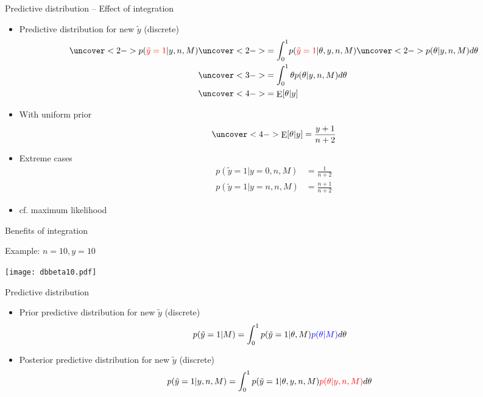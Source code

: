 \documentclass[english,t]{beamer}
\DeclareMathOperator{\E}{E}
\begin{document}
\begin{frame}{Predictive distribution -- Effect of integration}

  \begin{itemize}
  \item Predictive distribution for new $\tilde{y}$ (discrete)
    \begin{align*}
      \uncover<2->{p({\color{red}\tilde{y}=1}|y,n,M)} & \uncover<2->{= \int_0^1} p({\color{red}\tilde{y}=1}|\theta,y,n,M) \uncover<2->{p(\theta|y,n,M)d\theta}\\
                                                      &\uncover<3->{= \int_0^1 \theta p(\theta|y,n,M)d\theta}\\
                                                      &\uncover<4->{= \E[\theta|y]}
    \end{align*}
    \vskip -4mm
  \item<5-> With uniform prior
    \begin{align*}
      \uncover<4->{\E[\theta|y] = \frac{y+1}{n+2}}
    \end{align*}
  \item<6-> Extreme cases
    \begin{align*}
      p(\tilde{y}=1|y=0,n,M) &= \frac{1}{n+2} \\
      p(\tilde{y}=1|y=n,n,M) &= \frac{n+1}{n+2}
    \end{align*}
    \vskip -2mm

  \item<6-> cf. maximum likelihood

  \end{itemize}
\end{frame}

\begin{frame}{Benefits of integration}

  Example: $n=10, y=10$
  \begin{center}
    \texttt{[image: dbbeta10.pdf]}
  \end{center}

\end{frame}

\begin{frame}{Predictive distribution}

  \begin{itemize}
  \item {\color{blue} Prior predictive} distribution for new $\tilde{y}$ (discrete)
    \begin{align*}
      p(\tilde{y}=1|M) &= \int_0^1 p(\tilde{y}=1|\theta,M){\color{blue}p(\theta|M)}d\theta
    \end{align*}
  \item {\color{red} Posterior predictive} distribution for new $\tilde{y}$ (discrete)
    \begin{align*}
      p(\tilde{y}=1|y,n,M) &= \int_0^1 p(\tilde{y}=1|\theta,y,n,M){\color{red}p(\theta|y,n,M)}d\theta
    \end{align*}
  \end{itemize}
\end{frame}
\end{document}
